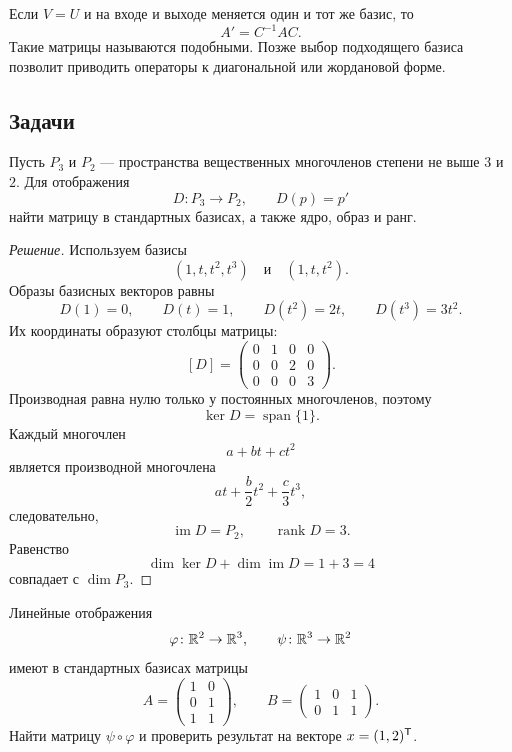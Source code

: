Если \(V=U\) и на входе и выходе меняется один и тот же базис, то
\[
A'=C^{-1}AC.
\]
Такие матрицы называются подобными. Позже выбор подходящего базиса позволит приводить операторы к диагональной или жордановой форме.

\subsection*{Задачи}

\begin{problem}
Пусть \(P_3\) и \(P_2\) --- пространства вещественных многочленов степени не выше \(3\) и \(2\). Для отображения
\[
D\colon P_3\to P_2,
\qquad
D(p)=p'
\]
найти матрицу в стандартных базисах, а также ядро, образ и ранг.
\end{problem}

\begin{proof}[Решение]
Используем базисы
\[
(1,t,t^2,t^3)
\quad\text{и}\quad
(1,t,t^2).
\]
Образы базисных векторов равны
\[
D(1)=0,
\qquad
D(t)=1,
\qquad
D(t^2)=2t,
\qquad
D(t^3)=3t^2.
\]
Их координаты образуют столбцы матрицы:
\[
[D]=
\begin{pmatrix}
0&1&0&0\\
0&0&2&0\\
0&0&0&3
\end{pmatrix}.
\]
Производная равна нулю только у постоянных многочленов, поэтому
\[
\ker D=\operatorname{span}\{1\}.
\]
Каждый многочлен
\[
a+bt+ct^2
\]
является производной многочлена
\[
at+\frac{b}{2}t^2+\frac{c}{3}t^3,
\]
следовательно,
\[
\operatorname{im}D=P_2,
\qquad
\operatorname{rank}D=3.
\]
Равенство
\[
\dim\ker D+\dim\operatorname{im}D=1+3=4
\]
совпадает с \(\dim P_3\).
\end{proof}

\begin{problem}
Линейные отображения
\[
\varphi\colon\mathbb{R}^2\to\mathbb{R}^3,
\qquad
\psi\colon\mathbb{R}^3\to\mathbb{R}^2
\]
имеют в стандартных базисах матрицы
\[
A=
\begin{pmatrix}
1&0\\
0&1\\
1&1
\end{pmatrix},
\qquad
B=
\begin{pmatrix}
1&0&1\\
0&1&1
\end{pmatrix}.
\]
Найти матрицу \(\psi\circ\varphi\) и проверить результат на векторе
\(x=(1,2)^{\mathsf{T}}\).
\end{problem}

